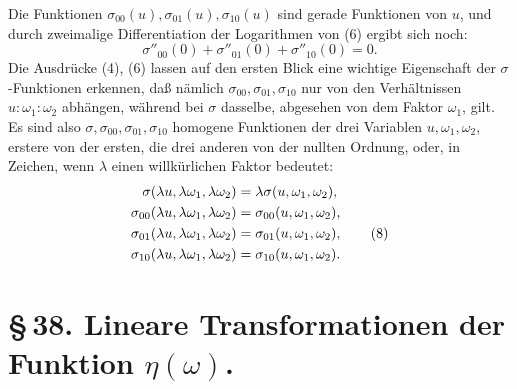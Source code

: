 \documentclass[11pt]{article}
\begin{document}
Die Funktionen $\sigma_{00}(u),\sigma_{01}(u),\sigma_{10}(u)$ sind gerade Funktionen von $u$, und durch zweimalige Differentiation der Logarithmen von (6) ergibt sich noch:
\begin{equation}
\sigma''_{00}(0)+\sigma''_{01}(0)+\sigma''_{10}(0)=0. \tag{7}
\end{equation}
Die Ausdrücke (4), (6) lassen auf den ersten Blick eine wichtige Eigenschaft der $\sigma$-Funktionen erkennen, daß nämlich $\sigma_{00},\sigma_{01},\sigma_{10}$ nur von den Verhältnissen $u:\omega_1:\omega_2$ abhängen, während bei $\sigma$ dasselbe, abgesehen von dem Faktor $\omega_1$, gilt. Es sind also $\sigma,\sigma_{00},\sigma_{01},\sigma_{10}$ homogene Funktionen der drei Variablen $u,
\omega_1,
\omega_2$, erstere von der ersten, die drei anderen von der nullten Ordnung, oder, in Zeichen, wenn $\lambda$ einen willkürlichen Faktor bedeutet:
\begin{align}
\sigma(\lambda u,\lambda\omega_1,\lambda\omega_2)&=\lambda\sigma(u,
\omega_1,
\omega_2),\notag\\
\sigma_{00}(\lambda u,\lambda\omega_1,\lambda\omega_2)&=\sigma_{00}(u,
\omega_1,
\omega_2),\notag\\
\sigma_{01}(\lambda u,\lambda\omega_1,\lambda\omega_2)&=\sigma_{01}(u,
\omega_1,
\omega_2), \tag{8}\\
\sigma_{10}(\lambda u,\lambda\omega_1,\lambda\omega_2)&=\sigma_{10}(u,
\omega_1,
\omega_2).\notag
\end{align}

\section*{\S\,38. Lineare Transformationen der Funktion $\eta(\omega)$.}
\end{document}
